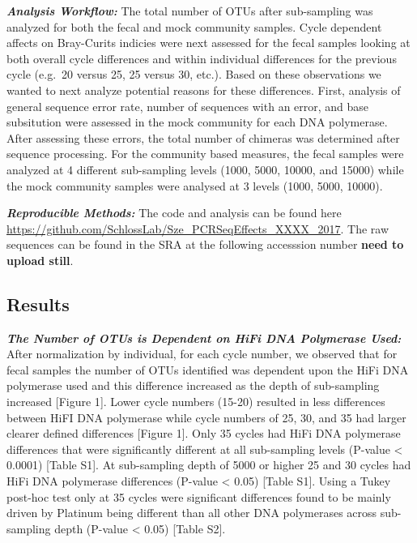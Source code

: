 \documentclass[12pt,]{article}
\begin{document}
\textbf{\emph{Analysis Workflow:}} The total number of OTUs after
sub-sampling was analyzed for both the fecal and mock community samples.
Cycle dependent affects on Bray-Curits indicies were next assessed for
the fecal samples looking at both overall cycle differences and within
individual differences for the previous cycle (e.g.~20 versus 25, 25
versus 30, etc.). Based on these observations we wanted to next analyze
potential reasons for these differences. First, analysis of general
sequence error rate, number of sequences with an error, and base
subsitution were assessed in the mock community for each DNA polymerase.
After assessing these errors, the total number of chimeras was
determined after sequence processing. For the community based measures,
the fecal samples were analyzed at 4 different sub-sampling levels
(1000, 5000, 10000, and 15000) while the mock community samples were
analysed at 3 levels (1000, 5000, 10000).

\textbf{\emph{Reproducible Methods:}} The code and analysis can be found
here \url{https://github.com/SchlossLab/Sze_PCRSeqEffects_XXXX_2017}.
The raw sequences can be found in the SRA at the following accesssion
number \textbf{need to upload still}.

\newpage

\subsection{Results}\label{results}

\textbf{\emph{The Number of OTUs is Dependent on HiFi DNA Polymerase
Used:}} After normalization by individual, for each cycle number, we
observed that for fecal samples the number of OTUs identified was
dependent upon the HiFi DNA polymerase used and this difference
increased as the depth of sub-sampling increased {[}Figure 1{]}. Lower
cycle numbers (15-20) resulted in less differences between HiFI DNA
polymerase while cycle numbers of 25, 30, and 35 had larger clearer
defined differences {[}Figure 1{]}. Only 35 cycles had HiFi DNA
polymerase differences that were significantly different at all
sub-sampling levels (P-value \textless{} 0.0001) {[}Table S1{]}. At
sub-sampling depth of 5000 or higher 25 and 30 cycles had HiFi DNA
polymerase differences (P-value \textless{} 0.05) {[}Table S1{]}. Using
a Tukey post-hoc test only at 35 cycles were significant differences
found to be mainly driven by Platinum being different than all other DNA
polymerases across sub-sampling depth (P-value \textless{} 0.05)
{[}Table S2{]}.
\end{document}
